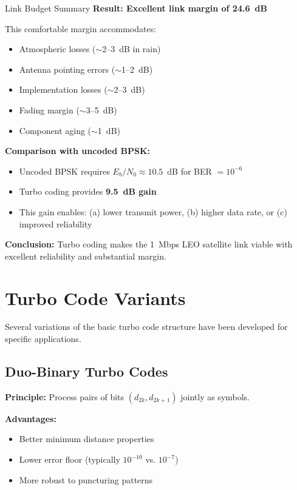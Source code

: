 \begin{calloutbox}[colback=black!8!white,colframe=black]{Link Budget Summary}
\textbf{Result: Excellent link margin of 24.6~dB}

This comfortable margin accommodates:
\begin{itemize}
\item Atmospheric losses ($\sim$2--3~dB in rain)
\item Antenna pointing errors ($\sim$1--2~dB)
\item Implementation losses ($\sim$2--3~dB)
\item Fading margin ($\sim$3--5~dB)
\item Component aging ($\sim$1~dB)
\end{itemize}

\textbf{Comparison with uncoded BPSK:}
\begin{itemize}
\item Uncoded BPSK requires $E_b/N_0 \approx 10.5$~dB for BER $= 10^{-6}$
\item Turbo coding provides \textbf{9.5~dB gain}
\item This gain enables: (a) lower transmit power, (b) higher data rate, or (c) improved reliability
\end{itemize}

\textbf{Conclusion:} Turbo coding makes the 1~Mbps LEO satellite link viable with excellent reliability and substantial margin.
\end{calloutbox}

\section{Turbo Code Variants}

Several variations of the basic turbo code structure have been developed for specific applications.

\subsection{Duo-Binary Turbo Codes}

\textbf{Principle:} Process pairs of bits $(d_{2k}, d_{2k+1})$ jointly as symbols.

\textbf{Advantages:}
\begin{itemize}
\item Better minimum distance properties
\item Lower error floor (typically $10^{-10}$ vs. $10^{-7}$)
\item More robust to puncturing patterns
\end{itemize}

